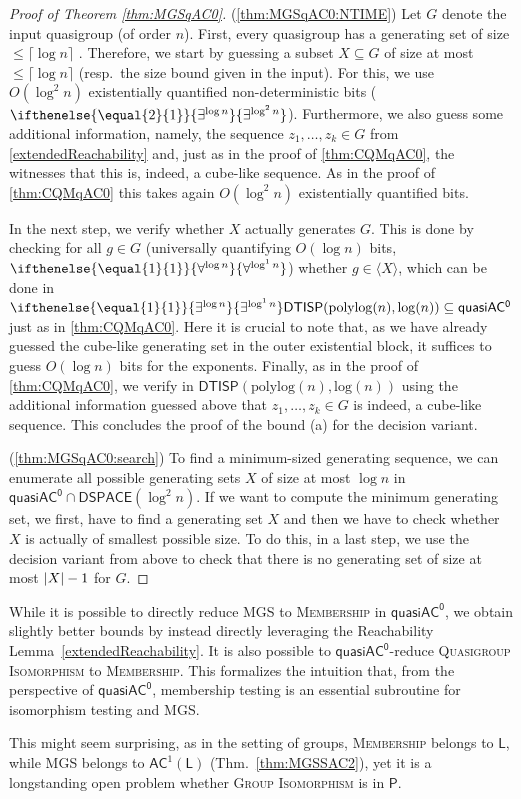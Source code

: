 \documentclass{article}
\newcommand{\algprobm}[1]{\textsc{#1}\xspace}
\newcommand{\betacc}[1]{\ifthenelse{\equal{#1}{1}}{\exists^{\log n}}{\exists^{\log^{#1}n}}} %
\newcommand{\alphacc}[1]{\ifthenelse{\equal{#1}{1}}{\forall^{\log n}}{\forall^{\log^{#1}n}}} %
\newcommand{\abs}[1]{\left|\mathinner{#1}\right|}
\newcommand{\Thm}[1]{Thm.~\ref{#1}\xspace}
\newcommand*{\ComplexityClass}[1]{\ensuremath{\mathsf{#1}}\xspace}
\newcommand{\DTISP}{\ComplexityClass{DTISP}}
\newcommand{\DTISPpll}{\ensuremath{\DTISP(\mathrm{polylog}(n),\mathrm{log}(n))}\xspace}
\newcommand*{\LogSpace}{\ComplexityClass{L}}
\newcommand{\qACz}{\ComplexityClass{quasiAC^0}}
\begin{document}
\begin{proof}[Proof of Theorem \ref{thm:MGSqAC0}]

(\ref{thm:MGSqAC0:NTIME}) Let $G$ denote the input quasigroup (of order $n$). First, every quasigroup has a generating set of size $\leq \lceil \log n \rceil$ \cite{MillerTarjan}. Therefore, we start by guessing a subset $X\subseteq G$ of size at most $\leq \lceil \log n \rceil$ (resp.\ the size bound given in the input). For this, we use $O(\log^2 n)$ existentially quantified non-deterministic bits ($\betacc{2}$). 
Furthermore, we also guess some additional information, namely, the sequence $z_1, \dots, z_k \in G$ from \cref{extendedReachability} and, just as in the proof of \cref{thm:CQMqAC0}, the witnesses that this is, indeed, a cube-like sequence. As in the proof of \cref{thm:CQMqAC0} this takes again $O(\log^2 n)$ existentially quantified bits.


 In the next step, we verify whether $X$ actually generates $G$. This is done by checking for all $g \in G$ (universally quantifying $O(\log n)$ bits, $\alphacc{1}$) whether $g \in \langle X \rangle$, which can be done in $\betacc{1}\DTISPpll \subseteq \qACz$ just as in \cref{thm:CQMqAC0}. 
 Here it is crucial to note that, as we have already guessed the cube-like generating set in the outer existential block, it suffices to guess $O(\log n)$ bits for the exponents. Finally, as in the proof of \cref{thm:CQMqAC0}, we verify in $\DTISPpll$ using the additional information guessed above that $z_1, \dots, z_k \in G$ is indeed, a cube-like sequence.
 This concludes the proof of the bound (a) for the decision variant. 

(\ref{thm:MGSqAC0:search})
To find a minimum-sized generating sequence,  we can enumerate all possible generating sets $X$ of size at most $\log n$ in $\qACz \cap \mathsf{DSPACE}(\log^2 n)$. 
If we want to compute the minimum generating set, we first, have to find a generating set $X$ and then we have to check whether $X$ is actually of smallest possible size. To do this, in a last step, we use the decision variant from above to check that there is no generating set of size at most $\abs{X} - 1$ for $G$.
\end{proof}

\begin{remark}
While it is possible to directly reduce \algprobm{MGS} to \algprobm{Membership} in $\qACz$, we obtain slightly better bounds by instead directly leveraging the Reachability Lemma~\ref{extendedReachability}. It is also possible to $\qACz$-reduce \algprobm{Quasigroup Isomorphism} to \algprobm{Membership}. This formalizes the intuition that, from the perspective of $\qACz$, membership testing is an essential subroutine for isomorphism testing and \algprobm{MGS}. 
 
This might seem surprising, as in the setting of groups, \algprobm{Membership} belongs to $\LogSpace$, while \algprobm{MGS} belongs to $\mathsf{AC}^{1}(\mathsf{L})$ (\Thm{thm:MGSSAC2}), yet it is a longstanding open problem whether \algprobm{Group Isomorphism} is in $\mathsf{P}$.   
\end{remark}
\end{document}
